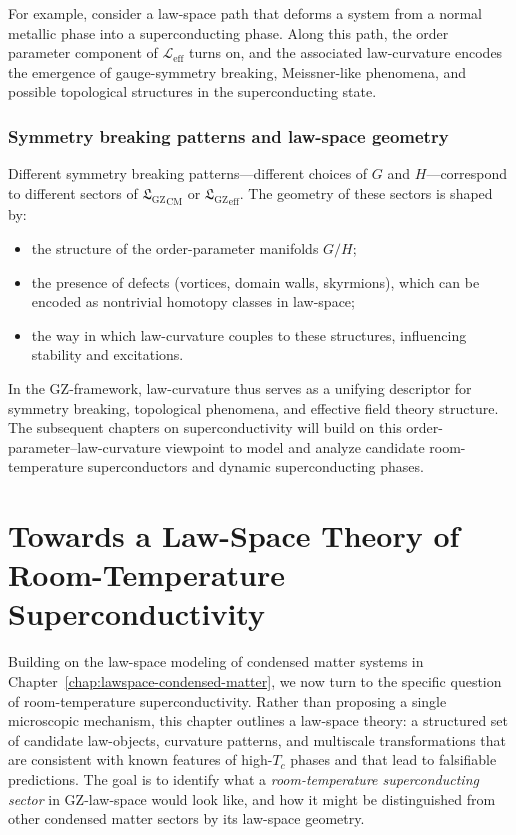 \documentclass[11pt]{book}
\newcommand{\GZLS}{\ensuremath{\mathfrak{L}_{\mathrm{GZ}}}}
\theoremstyle{plain}
\theoremstyle{definition}
\theoremstyle{remark}
\begin{document}
For example, consider a law-space path that deforms a system from a
normal metallic phase into a superconducting phase. Along this path,
the order parameter component of $\mathcal{L}_{\mathrm{eff}}$ turns
on, and the associated law-curvature encodes the emergence of
gauge-symmetry breaking, Meissner-like phenomena, and possible
topological structures in the superconducting state.

\subsection*{Symmetry breaking patterns and law-space geometry}

Different symmetry breaking patterns—different choices of $G$ and
$H$—correspond to different sectors of ${\GZLS}_{\mathrm{CM}}$ or
${\GZLS}_{\mathrm{eff}}$. The geometry of these sectors is shaped by:
\begin{itemize}
  \item the structure of the order-parameter manifolds $G/H$;
  \item the presence of defects (vortices, domain walls, skyrmions),
        which can be encoded as nontrivial homotopy classes in
        law-space;
  \item the way in which law-curvature couples to these structures,
        influencing stability and excitations.
\end{itemize}

In the GZ-framework, law-curvature thus serves as a unifying
descriptor for symmetry breaking, topological phenomena, and
effective field theory structure. The subsequent chapters on
superconductivity will build on this order-parameter–law-curvature
viewpoint to model and analyze candidate room-temperature
superconductors and dynamic superconducting phases.



\chapter[Towards a Law-Space Theory of Room-Temperature Superconductivity]{Towards a Law-Space Theory of Room-Temperature Superconductivity}
\label{chap:lawspace-rt-superconductivity}


Building on the law-space modeling of condensed matter systems in
Chapter~\ref{chap:lawspace-condensed-matter}, we now turn to the
specific question of room-temperature superconductivity. Rather than
proposing a single microscopic mechanism, this chapter outlines a
law-space theory: a structured set of candidate law-objects,
curvature patterns, and multiscale transformations that are
consistent with known features of high-$T_c$ phases and that lead to
falsifiable predictions. The goal is to identify what a
\emph{room-temperature superconducting sector} in GZ-law-space would
look like, and how it might be distinguished from other condensed
matter sectors by its law-space geometry.
\end{document}

